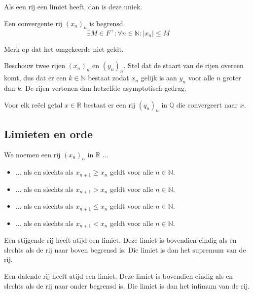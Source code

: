 \documentclass[main.tex]{subfiles}
\begin{document}
\begin{pr}
  Als een rij een limiet heeft, dan is deze uniek.
\end{pr}

\begin{pr}
  Een convergente rij $(x_{n})_{n}$ is begrensd.
  \[ \exists M \in F^{+}: \forall n\in \mathbb{N}: |x_{n}| \le M \]
\end{pr}

\begin{opm}
  Merk op dat het omgekeerde niet geldt.
\end{opm}

\begin{pr}
  Beschouw twee rijen $(x_{n})_{n}$ en $(y_{n})_{n}$.
  Stel dat de staart van de rijen overeen komt, dus dat er een $k\in \mathbb{N}$ bestaat zodat $x_{n}$ gelijk is aan $y_{n}$ voor alle $n$ groter dan $k$.
  De rijen vertonen dan hetzelfde asymptotisch gedrag.
\end{pr}

\begin{pr}
  Voor elk re\"eel getal $x\in \mathbb{R}$ bestaat er een rij $(q_{n})_{n}$ in $\mathbb{Q}$ die convergeert naar $x$.
\end{pr}

\subsection{Limieten en orde}
\label{sec:limieten-en-orde}


\begin{de}
  We noemen een rij $(x_{n})_{n}$ in $\mathbb{R}$ ...
  \begin{itemize}
  \item ...  als en slechts als $x_{n+1} \ge x_{n}$ geldt voor alle $n\in \mathbb{N}$.  
  \item ...  als en slechts als $x_{n+1} > x_{n}$ geldt voor alle $n\in \mathbb{N}$.  
  \item ...  als en slechts als $x_{n+1} \le x_{n}$ geldt voor alle $n\in \mathbb{N}$.  
  \item ...  als en slechts als $x_{n+1} < x_{n}$ geldt voor alle $n\in \mathbb{N}$.  
  \end{itemize}
\end{de}

\begin{st}
  Een stijgende rij heeft atijd een limiet.
  Deze limiet is bovendien eindig als en slechts als de rij naar boven begrensd is.
  Die limiet is dan het supremum van de rij.
\end{st}
\begin{st}
  Een dalende rij heeft atijd een limiet.
  Deze limiet is bovendien eindig als en slechts als de rij naar onder begrensd is.
  Die limiet is dan het infimum van de rij.
\end{st}
\end{document}
